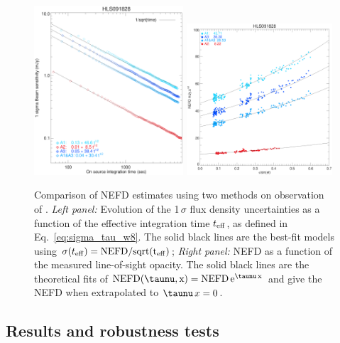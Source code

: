 \begin{figure}[!thbp]
  \begin{center}
    \includegraphics[trim={0.5cm, 0.5cm, 1.5cm, 1.8cm}, clip, angle=0, width=0.495\textwidth]{Figures/hls_nefd_vst.eps}
    \includegraphics[trim={0.5cm, 0, 0.2cm, 0.5cm}, clip, angle=0, width=0.485\textwidth]{Figures/hls_NEFD_vs_TauElev_all.eps}
    \caption{Comparison of NEFD estimates using two methods on
      observation of \hls. \emph{Left panel:} Evolution of the
    1\,$\sigma$ flux density uncertainties as a function of the effective
    integration time $t_{\rm{eff}}$, as defined in
    Eq.~\ref{eq:sigma_tau_w8}. The solid black lines are the best-fit models using
    $\sigma(t_{\rm{eff}}) = \rm{NEFD}/sqrt(t_{\rm{eff}})$;
    \emph{Right panel:} NEFD as a function
    of the measured line-of-sight opacity. The solid black lines are the
    theoretical fits of
    $\rm{NEFD}(\taunu, x) = \rm{NEFD}\, e^{\taunu\,x}$
    and give the NEFD when extrapolated
    to $\taunu\,x = 0$. }
    \label{fig:nefd_twomethods}
  \end{center}
\end{figure}

\subsection{Results and robustness tests}
\label{se:nefd_results}

